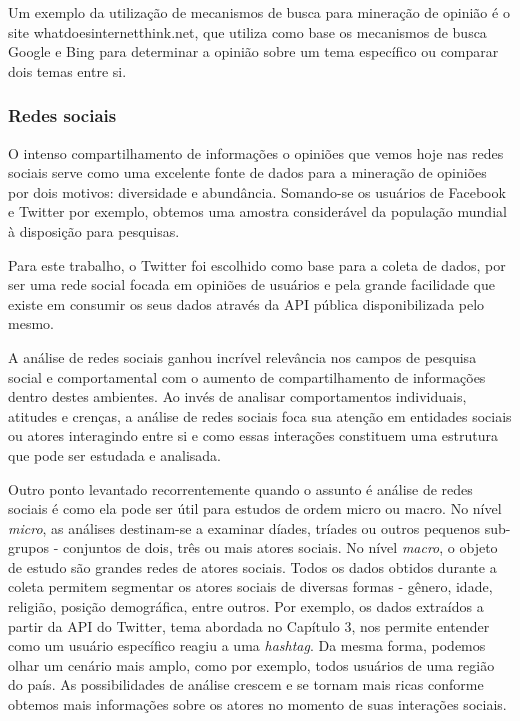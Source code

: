 Um exemplo da utilização de mecanismos de busca para mineração de opinião é o site whatdoesinternetthink.net\cite{whatdoesinternetthink}, que utiliza como base os mecanismos de busca Google e Bing para determinar a opinião sobre um tema específico ou comparar dois temas entre si.

\subsubsection{Redes sociais}

O intenso compartilhamento de informações o opiniões que vemos hoje nas redes sociais serve como uma excelente fonte de dados para a mineração de opiniões por dois motivos: diversidade e abundância. Somando-se os usuários de Facebook e Twitter por exemplo, obtemos uma amostra considerável da população mundial à disposição para pesquisas.

Para este trabalho, o Twitter foi escolhido como base para a coleta de dados, por ser uma rede social focada em opiniões de usuários e pela grande facilidade que existe em consumir os seus dados através da API pública disponibilizada pelo mesmo.

A análise de redes sociais ganhou incrível relevância nos campos de pesquisa social e comportamental\cite{wasserman1994advances} com o aumento de compartilhamento de informações dentro destes ambientes. Ao invés de analisar comportamentos individuais, atitudes e crenças, a análise de redes sociais foca sua atenção em entidades sociais ou atores interagindo entre si e como essas interações constituem uma estrutura que pode ser estudada e analisada.

Outro ponto levantado recorrentemente quando o assunto é análise de redes sociais é como ela pode ser útil para estudos de ordem micro ou macro. No nível \textit{micro}, as análises destinam-se a examinar díades, tríades ou outros pequenos sub-grupos - conjuntos de dois, três ou mais atores sociais. No nível \textit{macro}, o objeto de estudo são grandes redes de atores sociais.
Todos os dados obtidos durante a coleta permitem segmentar os atores sociais de diversas formas - gênero, idade, religião, posição demográfica, entre outros. Por exemplo, os dados extraídos a partir da API do Twitter, tema abordada no Capítulo 3, nos permite entender como um usuário específico reagiu a uma \textit{hashtag}. Da mesma forma, podemos olhar um cenário mais amplo, como por exemplo, todos usuários de uma região do país. As possibilidades de análise crescem e se tornam mais ricas conforme obtemos mais informações sobre os atores no momento de suas interações sociais.

